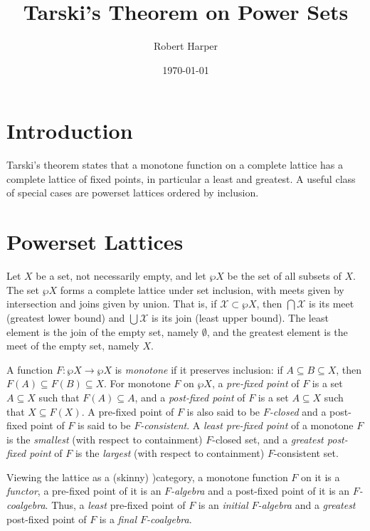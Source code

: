 \documentclass[11pt,twoside]{article}
\begin{document}
\title{Tarski's Theorem on Power Sets}
\author{Robert Harper}
\date{\today}

\maketitle{}

\section{Introduction}

Tarski's theorem states that a monotone function on a complete lattice has a
complete lattice of fixed points, in particular a least and greatest. A useful
class of special cases are powerset lattices ordered by inclusion.

\section{Powerset Lattices}

Let $X$ be a set, not necessarily empty, and let $\wp{X}$ be the set of all
subsets of $X$. The set $\wp{X}$ forms a complete lattice under set inclusion,
with meets given by intersection and joins given by union. That is, if
$\mathcal{X}\subset\wp{X}$, then $\bigcap{\mathcal{X}}$ is its meet (greatest lower bound) and
$\bigcup{\mathcal{X}}$ is its join (least upper bound). The least element is the join
of the empty set, namely $\emptyset$, and the greatest element is the meet of the empty
set, namely $X$.

A function $F:\wp{X}\to\wp{X}$ is \emph{monotone} if it preserves inclusion: if
$A\subseteq B\subseteq X$, then $F(A)\subseteq F(B)\subseteq X$. For monotone $F$ on
$\wp{X}$, a \emph{pre-fixed point} of $F$ is a set $A\subseteq X$ such that
$F(A)\subseteq A$, and a \emph{post-fixed point} of $F$ is a set $A\subseteq X$ such that
$X\subseteq F(X)$. A pre-fixed point of $F$ is also said to be \emph{$F$-closed} and a post-fixed
point of $F$ is said to be \emph{$F$-consistent}.  A \emph{least pre-fixed point} of a
monotone $F$ is the \emph{smallest} (with respect to containment) $F$-closed set, and a
\emph{greatest post-fixed point} of $F$ is the \emph{largest} (with respect to
containment) $F$-consistent set.

Viewing the lattice as a (skinny) )category, a monotone function $F$ on it is a
\emph{functor}, a pre-fixed point of it is an \emph{$F$-algebra} and a post-fixed point of
it is an \emph{$F$-coalgebra}. Thus, a \emph{least} pre-fixed point of $F$ is an
\emph{initial $F$-algebra} and a \emph{greatest} post-fixed point of $F$ is a \emph{final
  $F$-coalgebra}.
\end{document}
